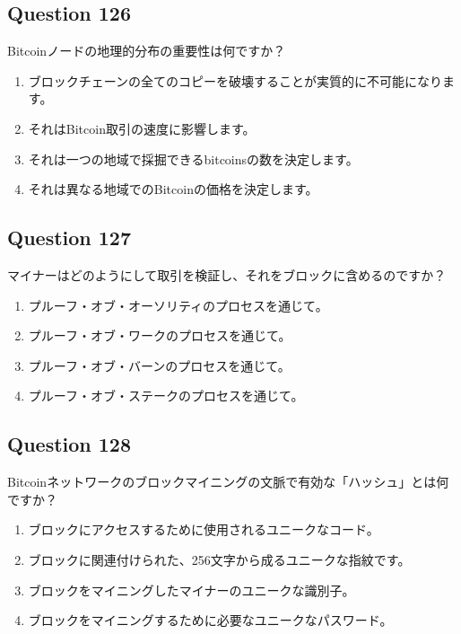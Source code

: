 \documentclass[12pt,a4paper]{article}
\begin{document}
\bigskip


\subsection*{Question 126}
Bitcoinノードの地理的分布の重要性は何ですか？

\begin{enumerate}[label=\Alph*., leftmargin=*]
\item ブロックチェーンの全てのコピーを破壊することが実質的に不可能になります。
\item それはBitcoin取引の速度に影響します。
\item それは一つの地域で採掘できるbitcoinsの数を決定します。
\item それは異なる地域でのBitcoinの価格を決定します。
\end{enumerate}

\bigskip


\subsection*{Question 127}
マイナーはどのようにして取引を検証し、それをブロックに含めるのですか？

\begin{enumerate}[label=\Alph*., leftmargin=*]
\item プルーフ・オブ・オーソリティのプロセスを通じて。
\item プルーフ・オブ・ワークのプロセスを通じて。
\item プルーフ・オブ・バーンのプロセスを通じて。
\item プルーフ・オブ・ステークのプロセスを通じて。
\end{enumerate}

\bigskip


\subsection*{Question 128}
Bitcoinネットワークのブロックマイニングの文脈で有効な「ハッシュ」とは何ですか？

\begin{enumerate}[label=\Alph*., leftmargin=*]
\item ブロックにアクセスするために使用されるユニークなコード。
\item ブロックに関連付けられた、256文字から成るユニークな指紋です。
\item ブロックをマイニングしたマイナーのユニークな識別子。
\item ブロックをマイニングするために必要なユニークなパスワード。
\end{enumerate}
\end{document}
